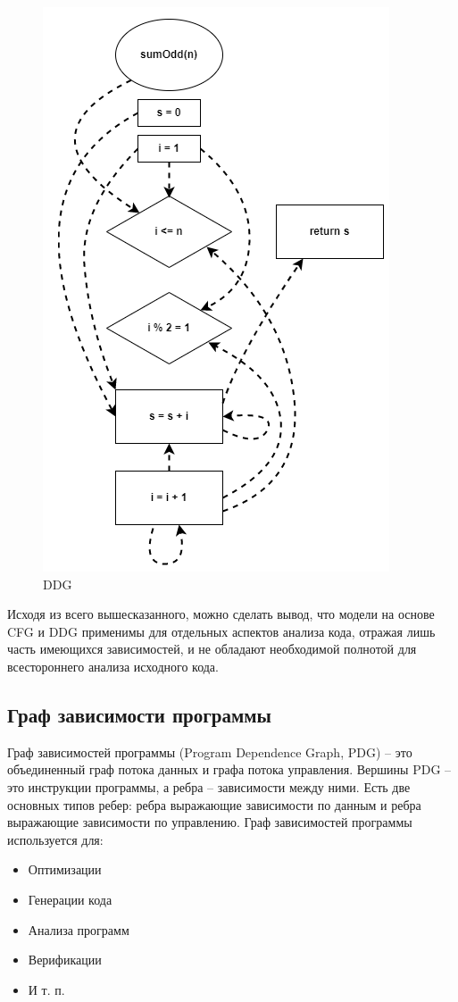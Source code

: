 \begin{figure}[h!]
	\center
	\includegraphics [scale=0.73] {my_folder/images/my/4}
	\caption{DDG}
	\label{fig:4}  
\end{figure}
\hfill \break
Исходя из всего вышесказанного, можно сделать вывод, что модели на основе CFG и DDG применимы для отдельных аспектов анализа кода, отражая лишь часть имеющихся зависимостей, и не обладают необходимой полнотой для всестороннего анализа исходного кода.
\newpage
\subsection{Граф зависимости программы} \label{ch1:subsec-title-abbr}
Граф зависимостей программы (Program Dependence Graph, PDG) – это объединенный граф потока данных и графа потока управления. Вершины PDG – это инструкции программы, а ребра – зависимости между ними. Есть две основных типов ребер: ребра выражающие зависимости по данным и ребра выражающие зависимости по управлению.
Граф зависимостей программы используется для:
\begin{itemize}
\item Оптимизации
\item Генерации кода
\item Анализа программ
\item Верификации
\item И т. п.
\end{itemize}

